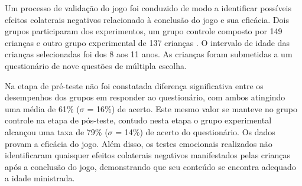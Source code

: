 







Um processo de validação do jogo foi conduzido de modo a identificar possíveis efeitos colaterais negativos relacionado à conclusão do jogo e sua eficácia. Dois grupos participaram dos experimentos, um grupo controle composto por 149 crianças e outro grupo experimental de 137 crianças \cite{muller2014child}. O intervalo de idade das crianças selecionadas foi dos 8 aos 11 anos. As crianças foram submetidas a um questionário de nove questões de múltipla escolha. %



Na etapa de pré-teste não foi constatada diferença significativa entre os desempenhos dos grupos em responder ao questionário, com ambos atingindo uma média de 61\% ($\sigma$ = 16\%) de acerto. Este mesmo valor se manteve no grupo controle na etapa de pós-teste, contudo nesta etapa o grupo experimental alcançou uma taxa de 79\%  ($\sigma$ = 14\%) de acerto do questionário. Os dados provam a eficácia do jogo. Além disso, os testes emocionais realizados não identificaram quaisquer efeitos colaterais negativos manifestados pelas crianças após a conclusão do jogo, demonstrando que seu conteúdo se encontra adequado a idade ministrada. 

